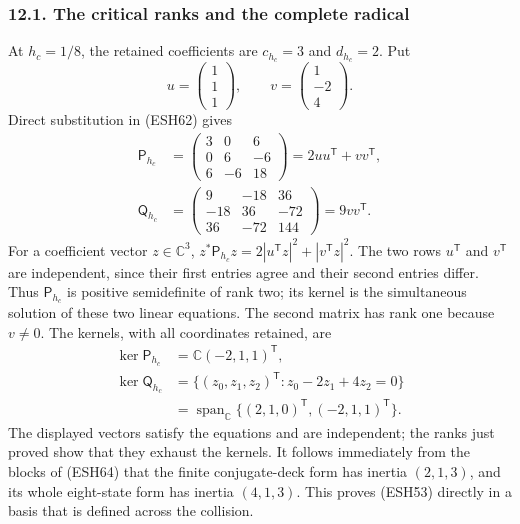 \documentclass[
  10pt,
  a4paper,
]{article}
\begin{document}
\subsubsection{12.1. The critical ranks and the complete
radical}\label{the-critical-ranks-and-the-complete-radical}

At \(h_c=1/8\), the retained coefficients are \(c_{h_c}=3\) and
\(d_{h_c}=2\). Put \[
u=\begin{pmatrix}1\\1\\1\end{pmatrix},\qquad
v=\begin{pmatrix}1\\-2\\4\end{pmatrix}.
\] Direct substitution in (ESH62) gives \[
\begin{aligned}
\mathsf P_{h_c}
&=\begin{pmatrix}3&0&6\\0&6&-6\\6&-6&18\end{pmatrix}
=2uu^{\mathsf T}+vv^{\mathsf T},\\
\mathsf Q_{h_c}
&=\begin{pmatrix}9&-18&36\\-18&36&-72\\36&-72&144\end{pmatrix}
=9vv^{\mathsf T}.
\end{aligned}
\tag{ESH65}
\] For a coefficient vector \(z\in\mathbb C^3\),
\(z^*\mathsf P_{h_c}z=2|u^{\mathsf T}z|^2+|v^{\mathsf T}z|^2\). The two
rows \(u^{\mathsf T}\) and \(v^{\mathsf T}\) are independent, since
their first entries agree and their second entries differ. Thus
\(\mathsf P_{h_c}\) is positive semidefinite of rank two; its kernel is
the simultaneous solution of these two linear equations. The second
matrix has rank one because \(v\ne0\). The kernels, with all coordinates
retained, are \[
\begin{aligned}
\ker\mathsf P_{h_c}&=\mathbb C(-2,1,1)^{\mathsf T},\\
\ker\mathsf Q_{h_c}
&=\{(z_0,z_1,z_2)^{\mathsf T}:z_0-2z_1+4z_2=0\}\\
&=\operatorname{span}_{\mathbb C}\{(2,1,0)^{\mathsf T},(-2,1,1)^{\mathsf T}\}.
\end{aligned}
\tag{ESH66}
\] The displayed vectors satisfy the equations and are independent; the
ranks just proved show that they exhaust the kernels. It follows
immediately from the blocks of (ESH64) that the finite conjugate-deck
form has inertia \((2,1,3)\), and its whole eight-state form has inertia
\((4,1,3)\). This proves (ESH53) directly in a basis that is defined
across the collision.
\end{document}

